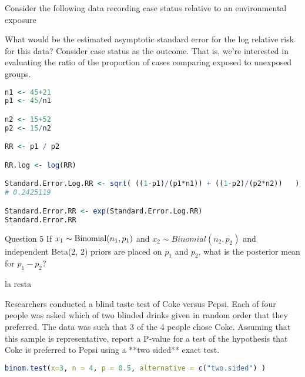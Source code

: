 \documentclass{homework}
\begin{document}
\begin{tcolorbox}[title=Question 4]
Consider the following data recording case status relative to an environmental exposure


What would be the estimated asymptotic standard error for the log relative risk for this data? Consider case status as the outcome. That is, we're interested in evaluating the ratio of the proportion of cases comparing exposed to unexposed groups. 
\end{tcolorbox}

\begin{lstlisting}[language=R]
n1 <- 45+21
p1 <- 45/n1

n2 <- 15+52
p2 <- 15/n2

RR <- p1 / p2

RR.log <- log(RR) 

Standard.Error.Log.RR <- sqrt( ((1-p1)/(p1*n1)) + ((1-p2)/(p2*n2))   )
# 0.2425119

Standard.Error.RR <- exp(Standard.Error.Log.RR) 
Standard.Error.RR
\end{lstlisting}

\begin{tcolorbox}[title=Question 5]
Question 5
If $x_1 \sim \textnormal{Binomial}(n_1, p_1)$ and $x_2 \sim Binomial(n_2, p_2)$ and independent Beta(2, 2) priors are placed on $p_1$ and $p_2$, what is the posterior mean for $p_1 - p_2$?
\end{tcolorbox}

la resta 

\begin{tcolorbox}[title=Question 6]
Researchers conducted a blind taste test of Coke versus Pepsi. Each of four people was asked which of two blinded drinks given in random order that they preferred. The data was such that 3 of the 4 people chose Coke. Assuming that this sample is representative, report a P-value for a test of the hypothesis that Coke is preferred to Pepsi using a **two sided** exact test.
\end{tcolorbox}

\begin{lstlisting}[language=R]
binom.test(x=3, n = 4, p = 0.5, alternative = c("two.sided") )
\end{lstlisting}

\clearpage
\end{document}
